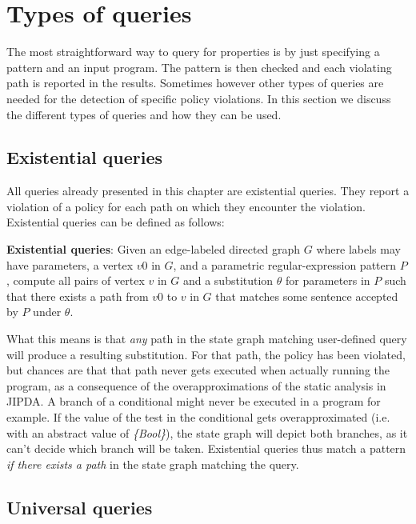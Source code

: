 
\section{Types of queries}
\label{sec:TypesOfQueries}

The most straightforward way to query for properties is by just specifying a pattern and an input program. The pattern is then checked and each violating path is reported in the results. Sometimes however other types of queries are needed for the detection of specific policy violations. In this section we discuss the different types of queries and how they can be used.

\subsection{Existential queries}
All queries already presented in this chapter are existential queries. They report a violation of a policy for each path on which they encounter the violation. Existential queries can be defined as follows:
\begin{definition}
\textbf{Existential queries}: Given an edge-labeled directed graph $G$ where labels may have parameters, a vertex $v0$ in $G$, and a parametric regular-expression pattern $P$, compute all pairs of vertex $v$ in $G$ and a substitution $\theta$ for parameters in $P$ such that there exists a path from $v0$ to $v$ in $G$ that matches some sentence accepted by $P$ under $\theta$.
\end{definition}

\noindent What this means is that \textit{any} path in the state graph matching user-defined query will produce a resulting substitution. For that path, the policy has been violated, but chances are that that path never gets executed when actually running the program, as a consequence of the overapproximations of the static analysis in JIPDA. A branch of a conditional might never be executed in a program for example. If the value of the test in the conditional gets overapproximated (i.e. with an abstract value of \textit{\{Bool\}}), the state graph will depict both branches, as it can't decide which branch will be taken. Existential queries thus match a pattern \textit{if there exists a path} in the state graph matching the query.

\subsection{Universal queries}

